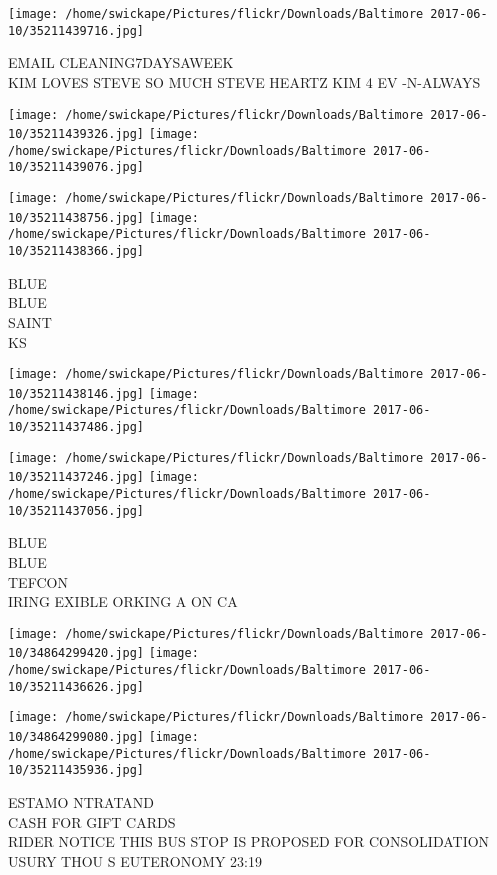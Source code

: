 \documentclass[10pt,letterpaper]{article}
\begin{document}
\vspace{0.25in}
\texttt{[image: /home/swickape/Pictures/flickr/Downloads/Baltimore 2017-06-10/35211439716.jpg]}

EMAIL CLEANING7DAYSAWEEK\\
KIM LOVES STEVE SO MUCH STEVE HEARTZ KIM 4 EV {-}N{-}ALWAYS
\pagebreak

\texttt{[image: /home/swickape/Pictures/flickr/Downloads/Baltimore 2017-06-10/35211439326.jpg]}
\texttt{[image: /home/swickape/Pictures/flickr/Downloads/Baltimore 2017-06-10/35211439076.jpg]}

\texttt{[image: /home/swickape/Pictures/flickr/Downloads/Baltimore 2017-06-10/35211438756.jpg]}
\texttt{[image: /home/swickape/Pictures/flickr/Downloads/Baltimore 2017-06-10/35211438366.jpg]}

BLUE\\
BLUE\\
SAINT\\
KS
\pagebreak

\texttt{[image: /home/swickape/Pictures/flickr/Downloads/Baltimore 2017-06-10/35211438146.jpg]}
\texttt{[image: /home/swickape/Pictures/flickr/Downloads/Baltimore 2017-06-10/35211437486.jpg]}

\texttt{[image: /home/swickape/Pictures/flickr/Downloads/Baltimore 2017-06-10/35211437246.jpg]}
\texttt{[image: /home/swickape/Pictures/flickr/Downloads/Baltimore 2017-06-10/35211437056.jpg]}

BLUE\\
BLUE\\
TEFCON\\
IRING EXIBLE ORKING A ON CA
\pagebreak

\texttt{[image: /home/swickape/Pictures/flickr/Downloads/Baltimore 2017-06-10/34864299420.jpg]}
\texttt{[image: /home/swickape/Pictures/flickr/Downloads/Baltimore 2017-06-10/35211436626.jpg]}

\texttt{[image: /home/swickape/Pictures/flickr/Downloads/Baltimore 2017-06-10/34864299080.jpg]}
\texttt{[image: /home/swickape/Pictures/flickr/Downloads/Baltimore 2017-06-10/35211435936.jpg]}

ESTAMO NTRATAND\\
CASH FOR GIFT CARDS\\
RIDER NOTICE THIS BUS STOP IS PROPOSED FOR CONSOLIDATION\\
USURY THOU S EUTERONOMY 23:19
\pagebreak
\end{document}
